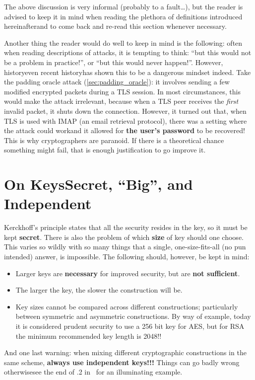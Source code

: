   \bigskip

  \noindent The above discussion is very informal (probably to a fault\dots), but the reader is advised to keep it in mind when reading the plethora of definitions introduced hereinafter\emd and to come back and re-read this section whenever necessary.

  \bigskip

   Another thing the reader would do well to keep in mind is the following: often when reading descriptions of attacks, it is tempting to think: ``but this would not be a problem in practice!'', or ``but this would never happen!''. However, history\emd even recent history\emd has shown this to be a dangerous mindset indeed. Take the padding oracle attack (\ts\ref{sec:padding_oracle}): it involves sending a few modified encrypted packets during a TLS session. In most circumstances, this would make the attack irrelevant, because when a TLS peer receives the \emph{first} invalid packet, it shuts down the connection. However, it turned out that, when TLS is used with IMAP (an email retrieval protocol), there was a setting where the attack could work\emd and it allowed for \textbf{the user's password} to be recovered! This is why cryptographers are paranoid. If there is a theoretical chance something might fail, that is enough justification to go improve it.

\section{On Keys\emd Secret, ``Big'', and Independent}
  \label{sec:on_keys}
  Kerckhoff's principle states that all the security resides in the key, so it must be kept \textbf{secret}. There is also the problem of which \textbf{size} of key should one choose. This varies so wildly with so many things that a single, one-size-fits-all (no pun intended) answer, is impossible. The following should, however, be kept in mind:
  \begin{itemize}
    \item Larger keys are \textbf{necessary} for improved security, but are \textbf{not sufficient}.
    \item The larger the key, the slower the construction will be.
    \item Key sizes cannot be compared across different constructions; particularly between symmetric and asymmetric constructions. By way of example, today it is considered prudent security to use a 256 bit key for AES, but for RSA the minimum recommended key length is 2048!!
  \end{itemize}
  And one last warning: when mixing different cryptographic constructions in the same scheme, \textbf{always use independent keys!!!} Things can go badly wrong otherwise\emd see the end of .2 in~\cite{KatzLindell:IMC} for an illuminating example.


